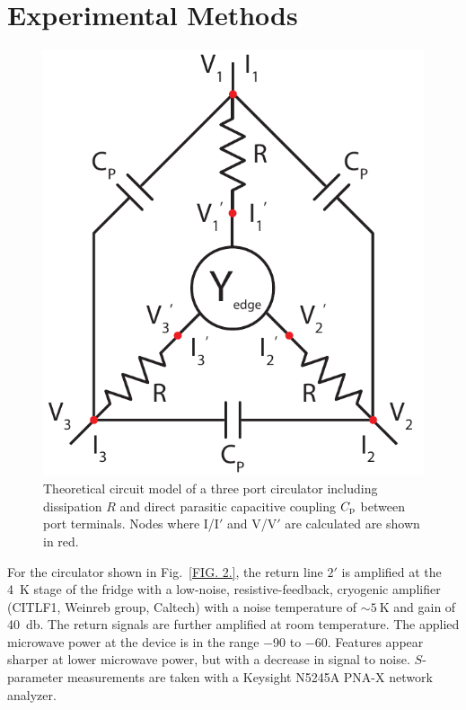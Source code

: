 \section{Experimental Methods}
\label{sec:qhe_exp}
\begin{figure}
  \includegraphics[scale=0.65]{Sfig2.pdf}
  \caption[Circuit model of a three-port QH circulator]{Theoretical circuit model of a three port circulator including dissipation $R$ and direct parasitic capacitive coupling $C_{\rm p}$ between port terminals. Nodes where I/I$'$ and V/V$'$ are calculated are shown in red.}
  \label{fig:qhe_s2}
\end{figure}

For the circulator shown in Fig.~\ref{FIG. 2.}, the return line $2'$ is amplified at the \SI{4}{\kelvin} stage of the fridge with a low-noise, resistive-feedback, cryogenic amplifier (CITLF1, Weinreb group, Caltech) with a noise temperature of $\sim \SI{5}{\kelvin}$ and gain of \SI{40}{\decibel}. The return signals are further amplified at room temperature. The applied microwave power at the device is in the range \SI{-90}{\dBm} to \SI{-60}{\dBm}. Features appear sharper at lower microwave power, but with a decrease in signal to noise. $S$-parameter measurements are taken with a Keysight N5245A PNA-X network analyzer.

